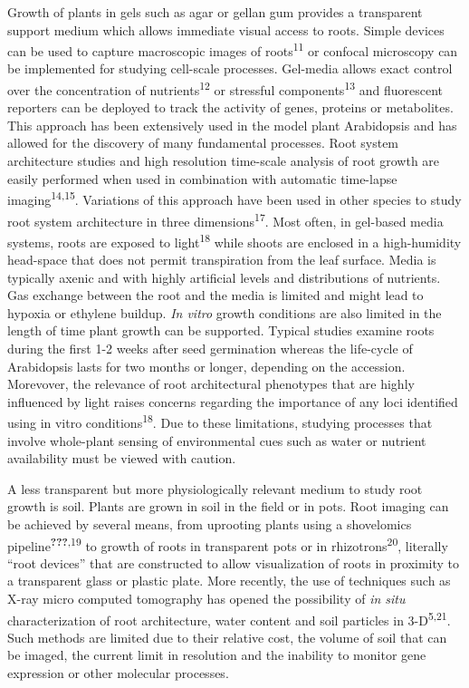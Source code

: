 \documentclass[]{article}
\begin{document}
Growth of plants in gels such as agar or gellan gum provides a
transparent support medium which allows immediate visual access to
roots. Simple devices can be used to capture macroscopic images of
roots\textsuperscript{11} or confocal microscopy can be implemented for
studying cell-scale processes. Gel-media allows exact control over the
concentration of nutrients\textsuperscript{12} or stressful
components\textsuperscript{13} and fluorescent reporters can be deployed
to track the activity of genes, proteins or metabolites. This approach
has been extensively used in the model plant Arabidopsis and has allowed
for the discovery of many fundamental processes. Root system
architecture studies and high resolution time-scale analysis of root
growth are easily performed when used in combination with automatic
time-lapse imaging\textsuperscript{14,15}. Variations of this approach
have been used in other species to study root system architecture in
three dimensions\textsuperscript{17}. Most often, in gel-based media
systems, roots are exposed to light\textsuperscript{18} while shoots are
enclosed in a high-humidity head-space that does not permit
transpiration from the leaf surface. Media is typically axenic and with
highly artificial levels and distributions of nutrients. Gas exchange
between the root and the media is limited and might lead to hypoxia or
ethylene buildup. \emph{In vitro} growth conditions are also limited in
the length of time plant growth can be supported. Typical studies
examine roots during the first 1-2 weeks after seed germination whereas
the life-cycle of Arabidopsis lasts for two months or longer, depending
on the accession. Morevover, the relevance of root architectural
phenotypes that are highly influenced by light raises concerns regarding
the importance of any loci identified using in vitro
conditions\textsuperscript{18}. Due to these limitations, studying
processes that involve whole-plant sensing of environmental cues such as
water or nutrient availability must be viewed with caution.

A less transparent but more physiologically relevant medium to study
root growth is soil. Plants are grown in soil in the field or in pots.
Root imaging can be achieved by several means, from uprooting plants
using a shovelomics pipeline\textsuperscript{\textbf{???},19} to growth
of roots in transparent pots or in rhizotrons\textsuperscript{20},
literally ``root devices'' that are constructed to allow visualization
of roots in proximity to a transparent glass or plastic plate. More
recently, the use of techniques such as X-ray micro computed tomography
has opened the possibility of \emph{in situ} characterization of root
architecture, water content and soil particles in
3-D\textsuperscript{5,21}. Such methods are limited due to their
relative cost, the volume of soil that can be imaged, the current limit
in resolution and the inability to monitor gene expression or other
molecular processes.
\end{document}
